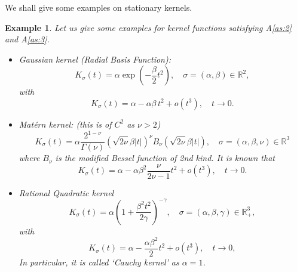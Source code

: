 \documentclass[a4paper,10pt,twoside]{article}
\newtheorem{example}{Example}[section]
\numberwithin{equation}{section}
\def\R{\mathbb{R}}
\def\l{\left}
\def\r{\right}
\def\a{\alpha}
\def\b{\beta}
\def\G{\Gamma}
\def\g{\gamma}
\def\s{\sigma}
\newcommand{\bi}{\begin{itemize}}
\newcommand{\ei}{\end{itemize}}
\begin{document}
We shall give some examples on stationary kernels. 
\begin{example} \label{ex:kernels}
Let us give some examples for kernel functions satisfying A\ref{as:2} and A\ref{as:3}. 
\bi
\item {\it Gaussian kernel (Radial Basis Function)}: 
\[
K_\s(t) = \a \exp\l(-\frac{\b}{2} t^2\r),\quad \s=(\a,\b) \in \R^2,
\]
with 
\[
K_\s(t) = \a - \a\b\,t^2 + o(t^3),\quad t\to 0.
\]

\item {\it Mat\'ern kernel}: (this is of $C^2$ as $\nu > 2$) 
\[
K_\s(t) = \a \frac{2^{1-\nu}}{\G(\nu)} \l( \sqrt{2\nu} \b |t| \r)^\nu B_\nu\l( \sqrt{2\nu} \b |t| \r),\quad \s=(\a,\b,\nu)\in \R^3
\]
where $B_\nu$ is the modified Bessel function of 2nd kind. It is known that 
\[
K_\s(t) =\a - \a \b^2\frac{\nu }{2\nu - 1} t^2 + o(t^3),\quad t\to 0. 
\]
\item {\it Rational Quadratic kernel}
\[
K_\s(t) = \a \l(1 + \frac{\b^2 t^2}{2\g} \r)^{-\g},\quad \s=(\a,\b,\g)\in \R_+^3, 
\]
with 
\[
K_\s(t) = \a - \frac{\a \b^2}{2} t^2 + o(t^3),\quad t\to 0, 
\]
In particular, it is called `Cauchy kernel' as $\a=1$. 
\ei
\end{example}
\end{document}
